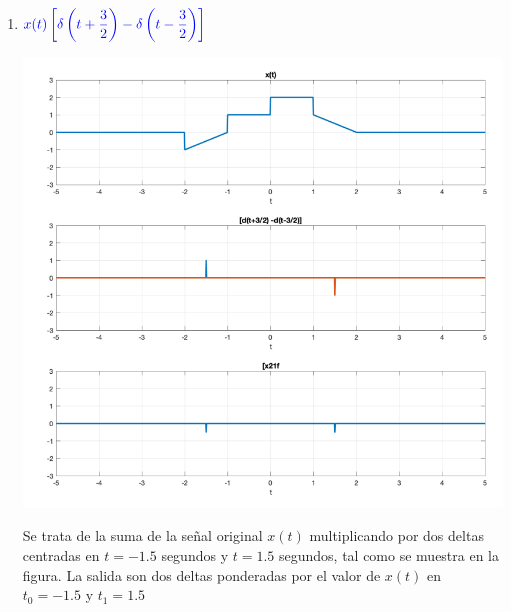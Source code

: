 \begin{enumerate}[label=\color{red}\textbf{\arabic*)}, leftmargin=*]
\begin{enumerate}[label=\color{red}\alph*)]
			\item $\textcolor{blue}{x(t)\left[\delta\left(t+\dfrac{3}{2}\right)-\delta\left(t-\dfrac{3}{2}\right)\right]}$
			
			\begin{minipage}{0.55\linewidth}
			\includegraphics[width=\linewidth]{"Temas/Tema 1/screenshot009.png"}
			\end{minipage}\qquad\begin{minipage}{0.35\textwidth}
			Se trata de la suma de la señal original $x(t)$ multiplicando por dos deltas centradas en $t=-1.5$ segundos y $t=1.5$ segundos, tal como se muestra en la figura. La salida son dos deltas ponderadas por el valor de $x(t)$ en $t_0=-1.5$ y $t_1=1.5$
			\end{minipage}
			
		\end{enumerate}
\end{enumerate}